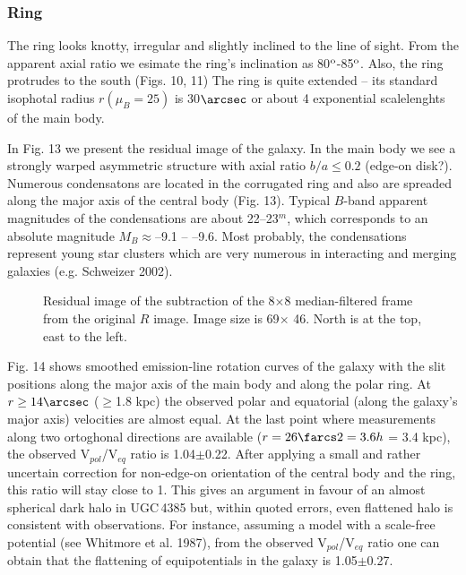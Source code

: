 \documentclass[]{aa}
\begin{document}
\subsubsection{Ring}

The ring looks knotty, irregular and slightly inclined to the
line of sight. From the apparent axial ratio we esimate the ring's 
inclination as 80$^{\rm o}$-85$^{\rm o}$. Also, the ring 
protrudes to the south (Figs. 10, 11) The ring is quite
extended -- its standard isophotal radius 
$r(\mu_B=25)$ is 30$\arcsec$ or about 4 exponential scalelenghts of
the main body.

In Fig. 13 we present the residual image of the galaxy. 
In the main body we see a strongly warped asymmetric structure 
with axial ratio $b/a \leq 0.2$ (edge-on disk?). 
Numerous condensatons are located in the corrugated
ring and also are spreaded along the major axis of the central
body (Fig. 13). Typical $B$-band apparent magnitudes of the
condensations are about 22--23$^m$, which corresponds to an
absolute magnitude $M_B \approx$--9.1 -- --9.6. Most probably,
the condensations represent young star clusters which are
very numerous in interacting and merging galaxies (e.g. Schweizer
2002).

\begin{figure}
\centerline{}
\caption{Residual image of the subtraction of the 8$\times$8
median-filtered frame from the original $R$ image. Image size is 
69\arcsec $\times$ 46\arcsec. North is at the top, east to the left.
}
\end{figure}

Fig. 14 shows smoothed emission-line rotation curves of the galaxy
with the slit positions along the major axis of the main body
and along the polar ring. At $r \geq 14\arcsec$ ($\geq$1.8 kpc)
the observed polar and equatorial (along the galaxy's major axis)
velocities are almost equal. At the last point where measurements
along two ortoghonal directions are available ($r = 26\farcs2 =
3.6h$ = 3.4 kpc), the observed V$_{pol}$/V$_{eq}$ ratio is
1.04$\pm$0.22. After applying a small and rather uncertain correction
for non-edge-on orientation of the central body and the ring,
this ratio will stay close to 1. This gives an argument in favour
of an almost spherical dark halo in UGC\,4385 but, within quoted
errors, even flattened halo is consistent with observations.
For instance, assuming a model with a scale-free potential
(see Whitmore et al. 1987), from the observed V$_{pol}$/V$_{eq}$ ratio
one can obtain that 
the flattening of equipotentials in the galaxy is 1.05$\pm$0.27.
\end{document}
